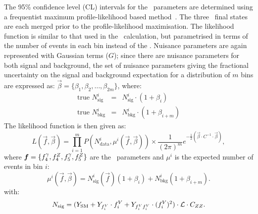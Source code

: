 The 95\% confidence level (CL) intervals for the \TGC\ parameters are determined
using a frequentist maximum profile-likelihood based method~\cite{Cowan:2010js}.
The three \lllplp\ final states are each merged prior to
the profile-likelihood maximisation. The likelihood function is similar
to that used in the \cx\ calculation, but parametrised in terms of the
number of events in each bin instead of the \cx.  Nuisance parameters are
again represented with Gaussian terms ($G$); since there are nuisance
parameters for both signal and background, the set of nuisance parameters giving
the fractional uncertainty on the signal and background expectation for a
distribution of $m$ bins are expressed as:
$\vec\beta = \{\beta_1, \beta_2, \ldots, \beta_{2m}\}$, where:
\begin{eqnarray}
\text{true }N_\mathrm{sig}^i &=& N_\mathrm{sig}^i \cdot (1 + \beta_i) \label{nuis1}\\
\text{true }N_\mathrm{bkg}^i &=& N_\mathrm{bkg}^i \cdot (1 + \beta_{i+m}) \label{nuis2}
\end{eqnarray}
The likelihood function is then given as:
\begin{equation}
L(\vec{f}, \vec{\beta}) =
\prod_{i=1}^{m}P(N_\mathrm{data}^i,\mu^i(\vec{f},\vec\beta))
\times
\frac{1}{(2\pi)^m}e^{-\frac{1}{2}\left(\vec\beta\cdot C^{-1}\cdot\vec\beta\right)},
\label{likelihood}
\end{equation}
where $\boldsymbol{f}=\{f_{4}^{\gamma}, f_{4}^{Z}, f_{5}^{\gamma}, f_{5}^{Z} \}$ are the \TGC\
parameters and $\mu^{i}$ is the expected number of events in bin $i$:
\begin{equation}
\mu^i(\vec{f},\vec{\beta})
= N_\mathrm{sig}^i(\vec{f})(1 + \beta_i) + N_\mathrm{bkg}^i(1 + \beta_{i+m}).
\end{equation}
with:
\begin{equation}
N_{\rm sig} = (Y_\mathrm{\rm SM} + Y_{f_i^V}\cdot f_i^V + Y_{f_i^Vf_i^V}\cdot (f_i^V)^2)\cdot\mathcal{L}\cdot{C_{ZZ}}.
\end{equation}

